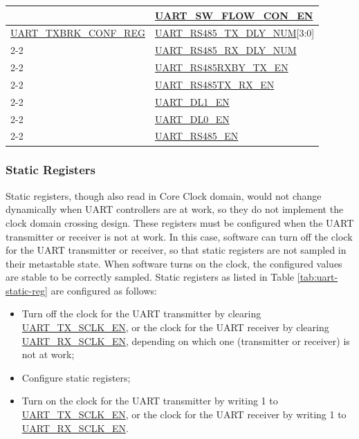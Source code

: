 \documentclass[main\_\_EN.tex]{subfiles}
\begin{document}
\begin{longtable}[c]{|m{6cm}|m{6cm}|}
 & \hyperref[fielddesc:UARTSWFLOWCONEN]{UART\_SW\_FLOW\_CON\_EN} \\\hline
\hyperref[regdesc:UARTTXBRKCONFREG]{UART\_TXBRK\_CONF\_REG} & \hyperref[fielddesc:UARTRS485TXDLYNUM]{UART\_RS485\_TX\_DLY\_NUM}[3:0] \\\cline{2-2}
 & \hyperref[fielddesc:UARTRS485RXDLYNUM]{UART\_RS485\_RX\_DLY\_NUM} \\\cline{2-2}
 & \hyperref[fielddesc:UARTRS485RXBYTXEN]{UART\_RS485RXBY\_TX\_EN} \\\cline{2-2}
 & \hyperref[fielddesc:UARTRS485TXRXEN]{UART\_RS485TX\_RX\_EN} \\\cline{2-2}
 & \hyperref[fielddesc:UARTDL1EN]{UART\_DL1\_EN} \\\cline{2-2}
 & \hyperref[fielddesc:UARTDL0EN]{UART\_DL0\_EN} \\\cline{2-2}
 & \hyperref[fielddesc:UARTRS485EN]{UART\_RS485\_EN} \\\hline
\end{longtable}

\subsubsection{Static Registers}\label{sec:uart-static-reg}

Static registers, though also read in Core Clock domain, would not change dynamically when UART controllers are at work, so they do not implement the clock domain crossing design. These registers must be configured when the UART transmitter or receiver is not at work. In this case, software can turn off the clock for the UART transmitter or receiver, so that static registers are not sampled in their metastable state. When software turns on the clock, the configured values are stable to be correctly sampled. Static registers as listed in Table \ref{tab:uart-static-reg} are configured as follows:

\begin{itemize}
    \item Turn off the clock for the UART transmitter by clearing \hyperref[fielddesc:UARTTXSCLKEN]{UART\_TX\_SCLK\_EN}, or the clock for the UART receiver by clearing \hyperref[fielddesc:UARTRXSCLKEN]{UART\_RX\_SCLK\_EN}, depending on which one (transmitter or receiver) is not at work;
    \item Configure static registers;
    \item Turn on the clock for the UART transmitter by writing 1 to \hyperref[fielddesc:UARTTXSCLKEN]{UART\_TX\_SCLK\_EN}, or the clock for the UART receiver by writing 1 to \hyperref[fielddesc:UARTRXSCLKEN]{UART\_RX\_SCLK\_EN}.
\end{itemize}
\end{document}
